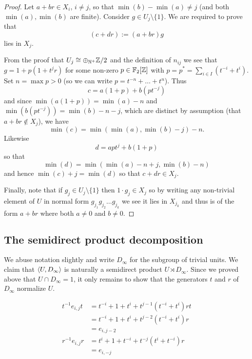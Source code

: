\begin{proof}
    Let $a + br \in X_i$, $i \neq j$, so that $\min(b) - \min(a) \neq j$ (and both $\min(a), \min(b)$ are finite).
    Consider $g \in U_j \setminus \{1 \}$.
    We are required to prove that \[
        (c + dr) := (a + br) g
    \] lies in $X_j$.

    From the proof that $U_j \cong \oplus_{\mathbb{N}^+} \mathbb{Z}/2$ and the definition of $n_{ij}$ we see that $g = 1 + p(1 + t^j r)$ for some non-zero $p \in \mathbb{F}_2[\mathbb{Z}]$ with $p = p^* = \sum_{i \in I} (t^{-i} + t^i)$.
    Set $n = \max p > 0$ (so we can write $p = t^{-n} + \dots + t^n$).
    Thus \[
        c = a(1 + p) + b(p t^{-j})
    \] and since $\min( a (1 + p)) = \min(a) - n$ and $\min (b(p t^{-j})) = \min(b) - n - j$, which are distinct by assumption (that $a + br \notin X_j$), we have \[
        \min(c) = \min(\min(a), \min(b) - j) - n.
    \]
    Likewise \[
        d = apt^j + b(1 + p)
    \] so that \[
        \min(d) = \min(\min(a) - n + j, \min(b) - n)
    \] and hence $\min(c) + j = \min(d)$ so that $c + dr \in X_j$.

    Finally, note that if $g_j \in U_j \setminus \{1\}$ then $1 \cdot g_j \in X_j$ so by writing any non-trivial element of $U$ in normal form $g_{j_1} g_{j_2} \dots g_{j_k}$ we see it lies in $X_{j_k}$ and thus is of the form $a + br$ where both $a \neq 0$ and $b \neq 0$.
\end{proof}

\subsection*{The semidirect product decomposition}

We abuse notation slightly and write $D_\infty$ for the subgroup of trivial units.
We claim that $\langle U, D_\infty \rangle$ is naturally a semidirect product $U \rtimes D_\infty$.
Since we proved above that $U \cap D_\infty = 1$, it only remains to show that the generators $t$ and $r$ of $D_\infty$ normalize $U$.

\begin{align*}
    t^{-1} e_{i,j} t
    &= t^{-i} + 1 + t^i + t^{j-1} (t^{-i} + t^i) r t \\
    &= t^{-i} + 1 + t^i + t^{j-2} (t^{-i} + t^i) r \\
    &= e_{i,j-2} \\
    r^{-1} e_{i,j} r
    &= t^i + 1 + t^{-i} + t^{-j}(t^i + t^{-i}) r \\
    &= e_{i,-j}
\end{align*}

